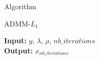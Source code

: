\begin{frame}{Algorithm}
\begin{algorithm}[H]
    \caption{ADMM-$L_{1}$} %
    \begin{algorithmic}[1]
        \newline
        \textbf{Input:} $y$, $\lambda$, $\rho$, $nb\_iterations$ \\
        \textbf{Output:} $x_{nb\_iterations}$
        \EndFor
        \EndProcedure
    \end{algorithmic}
\end{algorithm}
\end{frame}
    
    
    